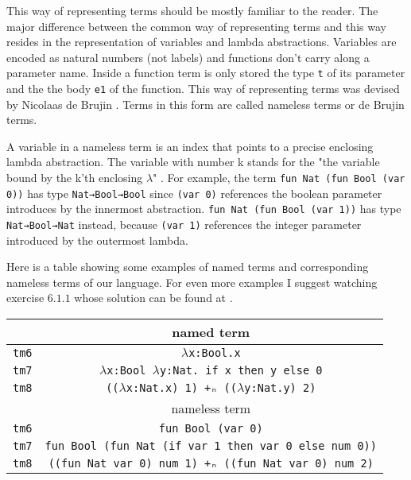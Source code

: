 \documentclass{article}
\begin{document}
This way of representing terms should be mostly familiar to the reader.
The major difference between the common way of representing terms and this way resides in the representation of variables and lambda abstractions.
Variables are encoded as natural numbers (not labels) and functions don't carry along a parameter name.
Inside a function term is only stored the type \texttt{t} of its parameter and the the body \texttt{e1} of the function.
This way of representing terms was devised by Nicolaas de Brujin \cite[Ch.\ 6]{pierce}.
Terms in this form are called nameless terms or de Brujin terms.

A variable in a nameless term is an index that points to a precise enclosing lambda abstraction.
The variable with number k stands for the "the variable bound by the k'th enclosing $\lambda$" \cite[Ch.\ 6 p.\ 76]{pierce}.
For example, the term \texttt{fun Nat (fun Bool (var 0))} has type \texttt{Nat→Bool→Bool} since \texttt{(var 0)} references the boolean parameter introduces by the innermost abstraction.
\texttt{fun Nat (fun Bool (var 1))} has type \texttt{Nat→Bool→Nat} instead, because \texttt{(var 1)} references the integer parameter introduced by the outermost lambda.

Here is a table showing some examples of named terms and corresponding nameless terms of our language.
For even more examples I suggest watching exercise $6.1.1$ \cite[p.\ 76]{pierce} whose solution can be found at \cite[p.\ 503]{pierce}.

\begin{center}
\begin{tabular}{ |c|c| } 
 \hline
 & named term \\
 \hline
 \texttt{tm6} & \texttt{$\lambda$x:Bool.x} \\
 \texttt{tm7} & \texttt{$\lambda$x:Bool $\lambda$y:Nat. if x then y else 0} \\
 \texttt{tm8} & \texttt{(($\lambda$x:Nat.x) 1) +ₙ (($\lambda$y:Nat.y) 2)} \\
 \hline
 \hline
 
 & nameless term \\
 \hline
 \texttt{tm6} & \texttt{fun Bool (var 0)} \\
 \texttt{tm7} & \texttt{fun Bool (fun Nat (if var 1 then var 0 else num 0))} \\
 \texttt{tm8} & \texttt{((fun Nat var 0) num 1) +ₙ ((fun Nat var 0) num 2)} \\
 
 \hline
\end{tabular}
\end{center}
\end{document}
